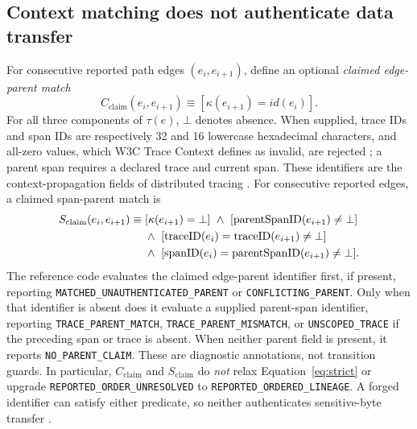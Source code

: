 \documentclass[11pt,letterpaper]{article}
\newcommand{\code}[1]{\texttt{#1}}
\newcommand{\st}[1]{\texttt{\scriptsize #1}}
\begin{document}
\subsection{Context matching does not authenticate data transfer}
For consecutive reported path edges \((e_i,e_{i+1})\), define an optional \emph{claimed edge-parent match}
\begin{equation}
C_{\mathrm{claim}}(e_i,e_{i+1})\equiv [\kappa(e_{i+1})=id(e_i)].\label{eq:context}
\end{equation}
For all three components of \(\tau(e)\), \(\bot\) denotes absence. When supplied, trace IDs and span IDs are respectively 32 and 16 lowercase hexadecimal characters, and all-zero values, which W3C Trace Context defines as invalid, are rejected \cite{w3ctrace}; a parent span requires a declared trace and current span. These identifiers are the context-propagation fields of distributed tracing \cite{otel_context}. For consecutive reported edges, a claimed span-parent match is
\begin{align}
S_{\mathrm{claim}}(e_i,e_{i+1})\equiv{}&[\kappa(e_{i+1})=\bot]\ \land\ [\operatorname{parentSpanID}(e_{i+1})\ne\bot] \notag\\
&\land\ [\operatorname{traceID}(e_i)=\operatorname{traceID}(e_{i+1})\ne\bot] \notag\\
&\land\ [\operatorname{spanID}(e_i)=\operatorname{parentSpanID}(e_{i+1})\ne\bot].\label{eq:spanmatch}
\end{align}
The reference code evaluates the claimed edge-parent identifier first, if present, reporting \code{MATCHED\_UNAUTHENTICATED\_PARENT} or \code{CONFLICTING\_PARENT}. Only when that identifier is absent does it evaluate a supplied parent-span identifier, reporting \code{TRACE\_PARENT\_MATCH}, \code{TRACE\_PARENT\_MISMATCH}, or \code{UNSCOPED\_TRACE} if the preceding span or trace is absent. When neither parent field is present, it reports \code{NO\_PARENT\_CLAIM}. These are diagnostic annotations, not transition guards. In particular, \(C_{\mathrm{claim}}\) and \(S_{\mathrm{claim}}\) do \emph{not} relax Equation~\eqref{eq:strict} or upgrade \st{REPORTED\_ORDER\_UNRESOLVED} to \st{REPORTED\_ORDERED\_LINEAGE}. A forged identifier can satisfy either predicate, so neither authenticates sensitive-byte transfer \cite{w3ctrace,otelapi}.
\end{document}
